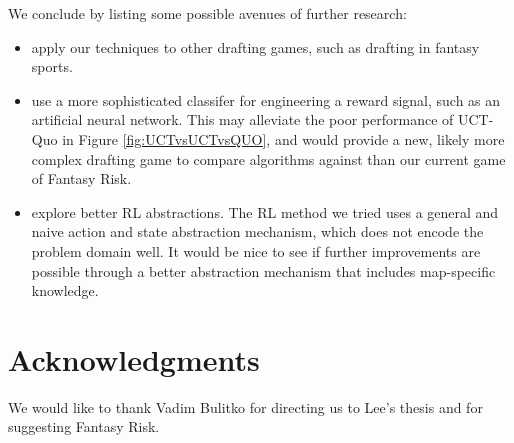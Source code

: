 \documentclass[letterpaper]{article}
\numberwithin{equation}{section}
\numberwithin{theorem}{section}
\numberwithin{lemma}{section}
\numberwithin{df}{section}
\begin{document}
We conclude by listing some possible avenues of further research:
\begin{itemize} \addtolength{\itemsep}{-0.5\baselineskip}
	\item apply our techniques to other drafting games, such as drafting in fantasy sports.  %
	\item use a more sophisticated classifer for engineering a reward signal, such as an artificial neural network.  This may alleviate the poor performance of UCT-Quo in Figure \ref{fig:UCTvsUCTvsQUO}, and would provide a new, likely more complex drafting game to compare algorithms against than our current game of Fantasy Risk.
	\item explore better RL abstractions.  The RL method we tried uses a general and naive action and state abstraction mechanism, which does not encode the problem domain well.  %
	It would be nice to see if further improvements are possible through a better abstraction mechanism that includes map-specific knowledge.
\end{itemize}

\section*{Acknowledgments}
We would like to thank Vadim Bulitko for directing us to Lee's thesis and for suggesting Fantasy Risk.  %

%
%


\end{document}
